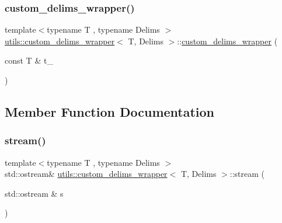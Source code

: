 \subsubsection{\texorpdfstring{custom\_delims\_wrapper()}{custom\_delims\_wrapper()}}
{\footnotesize\ttfamily template$<$typename T , typename Delims $>$ \\
\mbox{\hyperlink{structutils_1_1custom__delims__wrapper}{utils\+::custom\+\_\+delims\+\_\+wrapper}}$<$ T, Delims $>$\+::\mbox{\hyperlink{structutils_1_1custom__delims__wrapper}{custom\+\_\+delims\+\_\+wrapper}} (\begin{DoxyParamCaption}\item[{const T \&}]{t\+\_\+ }\end{DoxyParamCaption})\hspace{0.3cm}{\ttfamily [inline]}}



\subsection{Member Function Documentation}
\mbox{\label{structutils_1_1custom__delims__wrapper_a67631c11d4de7ba45a69e402fb62b4b8}} 
\subsubsection{\texorpdfstring{stream()}{stream()}\hspace{0.1cm}{\footnotesize\ttfamily [1/2]}}
{\footnotesize\ttfamily template$<$typename T , typename Delims $>$ \\
std\+::ostream\& \mbox{\hyperlink{structutils_1_1custom__delims__wrapper}{utils\+::custom\+\_\+delims\+\_\+wrapper}}$<$ T, Delims $>$\+::stream (\begin{DoxyParamCaption}\item[{std\+::ostream \&}]{s }\end{DoxyParamCaption})\hspace{0.3cm}{\ttfamily [inline]}}

\mbox{\label{structutils_1_1custom__delims__wrapper_ae2079ff077884404ebf307ff293630cc}} 
